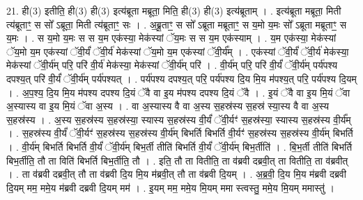 \documentclass[17pt]{extarticle}
\begin{document}
21. ही(3) इतीति॒ ही(3) ही(3) इत्य॑ब्रूता मब्रूता॒ मिति॒ ही(3) ही(3) इत्य॑ब्रूताम् । . इत्य॑ब्रूता मब्रूता॒ मिती त्य॑ब्रूताꣳ॒॒ स सो᳚ ऽब्रूता॒ मिती त्य॑ब्रूताꣳ॒॒ सः । . अ॒ब्रू॒ताꣳ॒॒ स सो᳚ ऽब्रूता मब्रूताꣳ॒॒ स य॒मो य॒मः सो᳚ ऽब्रूता मब्रूताꣳ॒॒ स य॒मः । . स य॒मो य॒मः स स य॒म एक॑स्या॒ मेक॑स्यां ॅय॒मः स स य॒म एक॑स्याम् । . य॒म एक॑स्या॒ मेक॑स्यां ॅय॒मो य॒म एक॑स्यां ॅवी॒र्यं॑ ॅवी॒र्य॑ मेक॑स्यां ॅय॒मो य॒म एक॑स्यां ॅवी॒र्य᳚म् । . एक॑स्यां ॅवी॒र्यं॑ ॅवी॒र्य॑ मेक॑स्या॒ मेक॑स्यां ॅवी॒र्य॑म् परि॒ परि॑ वी॒र्य॑ मेक॑स्या॒ मेक॑स्यां ॅवी॒र्य॑म् परि॑ । . वी॒र्य॑म् परि॒ परि॑ वी॒र्यं॑ ॅवी॒र्य॑म् पर्य॑पश्य दपश्य॒त् परि॑ वी॒र्यं॑ ॅवी॒र्य॑म् पर्य॑पश्यत् । . पर्य॑पश्य दपश्य॒त् परि॒ पर्य॑पश्य दि॒य मि॒य म॑पश्य॒त् परि॒ पर्य॑पश्य दि॒यम् । . अ॒प॒श्य॒ दि॒य मि॒य म॑पश्य दपश्य दि॒यं ॅवै वा इ॒य म॑पश्य दपश्य दि॒यं ॅवै । . इ॒यं ॅवै वा इ॒य मि॒यं ॅवा अ॒स्यास्य वा इ॒य मि॒यं ॅवा अ॒स्य । . वा अ॒स्यास्य वै वा अ॒स्य स॒हस्र॑स्य स॒हस्र॑ स्या॒स्य वै वा अ॒स्य स॒हस्र॑स्य । . अ॒स्य स॒हस्र॑स्य स॒हस्र॑स्या॒ स्यास्य स॒हस्र॑स्य वी॒र्यं॑ ॅवी॒र्यꣳ॑ स॒हस्र॑स्या॒ स्यास्य स॒हस्र॑स्य वी॒र्य᳚म् । . स॒हस्र॑स्य वी॒र्यं॑ ॅवी॒र्यꣳ॑ स॒हस्र॑स्य स॒हस्र॑स्य वी॒र्य॑म् बिभर्ति बिभर्ति वी॒र्यꣳ॑ स॒हस्र॑स्य स॒हस्र॑स्य वी॒र्य॑म् बिभर्ति । . वी॒र्य॑म् बिभर्ति बिभर्ति वी॒र्यं॑ ॅवी॒र्य॑म् बिभ॒र्ती तीति॑ बिभर्ति वी॒र्यं॑ ॅवी॒र्य॑म् बिभ॒र्तीति॑ । . बि॒भ॒र्ती तीति॑ बिभर्ति बिभ॒र्तीति॒ तौ ता विति॑ बिभर्ति बिभ॒र्तीति॒ तौ । . इति॒ तौ ता वितीति॒ ता व॑ब्रवी दब्रवी॒त् ता वितीति॒ ता व॑ब्रवीत् । . ता व॑ब्रवी दब्रवी॒त् तौ ता व॑ब्रवी दि॒य मि॒य म॑ब्रवी॒त् तौ ता व॑ब्रवी दि॒यम् । . अ॒ब्र॒वी॒ दि॒य मि॒य म॑ब्रवी दब्रवी दि॒यम् मम॒ ममे॒य म॑ब्रवी दब्रवी दि॒यम् मम॑ । . इ॒यम् मम॒ ममे॒य मि॒यम् ममा स्त्वस्तु॒ ममे॒य मि॒यम् ममास्तु॑ । \newline
\end{document}
